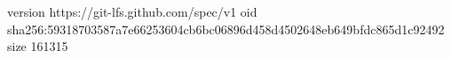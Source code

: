 version https://git-lfs.github.com/spec/v1
oid sha256:59318703587a7e66253604cb6bc06896d458d4502648eb649bfdc865d1c92492
size 161315
